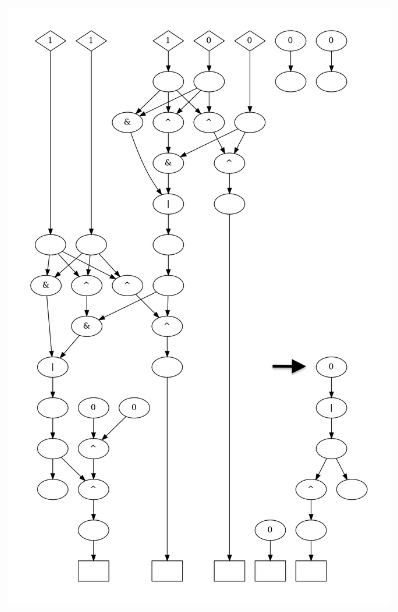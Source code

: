 \documentclass[a4paper,12pt]{article}
\begin{document}
\begin{figure}[H]
    \centering
        \begin{minipage}{0.49\textwidth}
            \includegraphics[width=0.9\textwidth]{figures/half_adder/debug_evualte_16-1.png}
        \end{minipage}
        \begin{minipage}{0.49\textwidth}

\end{minipage}
\end{figure}
\end{document}

